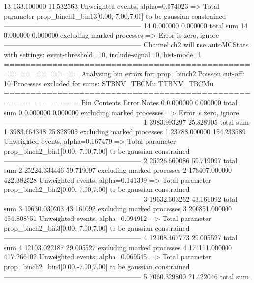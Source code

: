 13         133.000000      11.532563       Unweighted events, alpha=0.074023
  => Total parameter prop_binch1_bin13[0.00,-7.00,7.00] to be gaussian constrained
------------------------------------------------------------
14         0.000000        0.000000        total sum                     
14         0.000000        0.000000        excluding marked processes    
  => Error is zero, ignore      
------------------------------------------------------------
Channel ch2 will use autoMCStats with settings: event-threshold=10, include-signal=0, hist-mode=1
============================================================
Analysing bin errors for: prop_binch2
Poisson cut-off: 10
Processes excluded for sums: STBNV_TBCMu TTBNV_TBCMu
============================================================
Bin        Contents        Error           Notes                         
0          0.000000        0.000000        total sum                     
0          0.000000        0.000000        excluding marked processes    
  => Error is zero, ignore      
------------------------------------------------------------
1          3983.993297     25.828905       total sum                     
1          3983.664348     25.828905       excluding marked processes    
1          23788.000000    154.233589      Unweighted events, alpha=0.167479
  => Total parameter prop_binch2_bin1[0.00,-7.00,7.00] to be gaussian constrained
------------------------------------------------------------
2          25226.660086    59.719097       total sum                     
2          25224.334446    59.719097       excluding marked processes    
2          178407.000000   422.382528      Unweighted events, alpha=0.141399
  => Total parameter prop_binch2_bin2[0.00,-7.00,7.00] to be gaussian constrained
------------------------------------------------------------
3          19632.603262    43.161092       total sum                     
3          19630.030203    43.161092       excluding marked processes    
3          206851.000000   454.808751      Unweighted events, alpha=0.094912
  => Total parameter prop_binch2_bin3[0.00,-7.00,7.00] to be gaussian constrained
------------------------------------------------------------
4          12108.467773    29.005527       total sum                     
4          12103.022187    29.005527       excluding marked processes    
4          174111.000000   417.266102      Unweighted events, alpha=0.069545
  => Total parameter prop_binch2_bin4[0.00,-7.00,7.00] to be gaussian constrained
------------------------------------------------------------
5          7060.329800     21.422046       total sum                     
